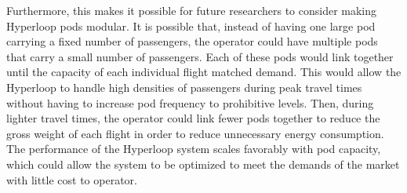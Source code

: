 Furthermore, this makes it possible for future researchers to consider making
Hyperloop pods modular. It is possible that, instead of having one large pod
carrying a fixed number of passengers, the operator could have multiple pods
that carry a small number of passengers. Each of these pods would link together until the capacity
of each individual flight matched demand.
This would allow the Hyperloop to handle high densities of passengers during
peak travel times without having to increase pod frequency to prohibitive levels.
Then, during lighter travel times, the operator could link fewer pods together
to reduce the gross weight of each flight in order to reduce unnecessary energy consumption.
The performance of the Hyperloop system scales favorably with pod capacity,
which could allow the system to be optimized to meet the demands
of the market with little cost to operator.
